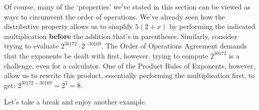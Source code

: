 \smallskip

Of course, many of the `properties' we've stated in this section can be viewed as ways to circumvent the order of operations. We've already seen how the distributive property allows us to simplify $5(2+x)$ by performing the indicated multiplication \textbf{before} the addition that's in parentheses.  Similarly, consider trying to evaluate $2^{30172}\cdot 2^{-30169}$.  The Order of Operations Agreement demands that the exponents be dealt with first, however, trying to compute $2^{30172}$ is a challenge, even for a calculator.  One of the Product Rules of Exponents, however, allow us to rewrite this product, essentially performing the multiplication first, to get:  $2^{30172-30169} = 2^{3} = 8$.  

\smallskip

Let's take a break and enjoy another example.

\smallskip

